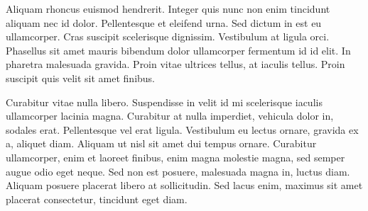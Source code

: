 \documentclass[final,inline,a4paper,narroweqnarray]{ieee}
\begin{document}
Aliquam rhoncus euismod hendrerit. Integer quis nunc non enim tincidunt aliquam nec id dolor. Pellentesque et eleifend urna. Sed dictum in est eu ullamcorper. Cras suscipit scelerisque dignissim. Vestibulum at ligula orci. Phasellus sit amet mauris bibendum dolor ullamcorper fermentum id id elit. In pharetra malesuada gravida. Proin vitae ultrices tellus, at iaculis tellus. Proin suscipit quis velit sit amet finibus.

Curabitur vitae nulla libero. Suspendisse in velit id mi scelerisque iaculis ullamcorper lacinia magna. Curabitur at nulla imperdiet, vehicula dolor in, sodales erat. Pellentesque vel erat ligula. Vestibulum eu lectus ornare, gravida ex a, aliquet diam. Aliquam ut nisl sit amet dui tempus ornare. Curabitur ullamcorper, enim et laoreet finibus, enim magna molestie magna, sed semper augue odio eget neque. Sed non est posuere, malesuada magna in, luctus diam. Aliquam posuere placerat libero at sollicitudin. Sed lacus enim, maximus sit amet placerat consectetur, tincidunt eget diam.
\end{document}

